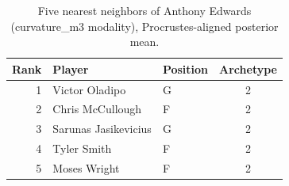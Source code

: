 \begin{table}[htbp]
  \centering\small
  \begin{tabular}{rllc}
    \toprule
    Rank & Player & Position & Archetype \\
    \midrule
    1 & Victor Oladipo & G & 2 \\
    2 & Chris McCullough & F & 2 \\
    3 & Sarunas Jasikevicius & G & 2 \\
    4 & Tyler Smith & F & 2 \\
    5 & Moses Wright & F & 2 \\
    \bottomrule
  \end{tabular}
  \caption{Five nearest neighbors of Anthony Edwards (curvature_m3 modality), Procrustes-aligned posterior mean.}
  \label{tab:Anthony_Edwards_neighbors_curvature_m3}
\end{table}

